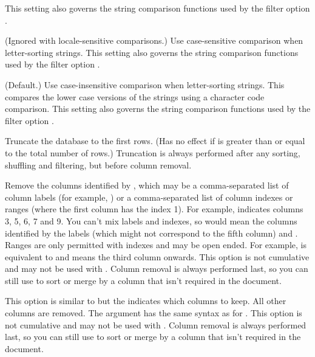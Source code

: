 This setting also governs the string comparison functions used by 
the filter option .

(Ignored with locale-sensitive comparisons.)
Use case-sensitive comparison when letter-sorting strings.
This setting also governs the string comparison functions
used by the filter option .

(Default.) Use case-insensitive comparison when letter-sorting strings.
This compares the lower case versions of the strings using a
character code comparison. This setting also governs the string
comparison functions used by the filter option .

Truncate the database to the first  rows.
(Has no effect if  is greater than or equal
to the total number of rows.) Truncation is always performed
after any sorting, shuffling and filtering, but before column 
removal.

Remove the columns identified by , which
may be a comma-separated list of column labels (for example, 
) or a comma-separated list of column indexes
or ranges (where the first column has the index 1). For example,
 indicates columns 3, 5, 6, 7 and 9. You can't mix
labels and indexes, so  would mean the
columns identified by the labels   (which
might not correspond to the fifth column) and .
Ranges are only permitted with indexes and may be open ended. For 
example,  is equivalent to  and  means
the third column onwards. This option is not cumulative and
may not be used with . Column removal
is always performed last, so you can still use  to sort or merge 
by a column that isn't required in the document.

This option is similar to  but the
 indicates which columns to keep. All other
columns are removed. The argument has the same syntax as for
. This option is not cumulative and 
may not be used with . Column removal
is always performed last, so you can still use  to sort or merge 
by a column that isn't required in the document.

